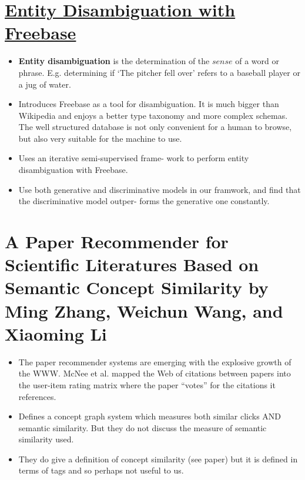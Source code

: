 \documentclass[12pt]{article}
\newcommand{\bt}[1]{\textbf{#1}}
\newcommand{\bi}[0]{  \begin{itemize}}
\newcommand{\ei}[0]{  \end{itemize}}
\newcommand{\q}[0]{\item}
\begin{document}
\section{\href{https://github.com/nmonath/NLPProject/blob/master/research/papers/7-entity_desambiguation_freebase.pdf}{Entity Disambiguation with Freebase}}
\bi
\q \bt{Entity disambiguation} is the determination of the $sense$ of a word or phrase. E.g. determining if `The pitcher fell over' refers to a baseball player or a jug of water.
\q Introduces Freebase as a tool for disambiguation. It is much bigger than Wikipedia and enjoys a better type taxonomy and more complex schemas. The well structured database is not only convenient for a human to browse, but also very suitable for the machine to use.
\q Uses an iterative semi-supervised frame- work to perform entity disambiguation with Freebase.  
\q Use both generative and discriminative models in our framwork, and find that the discriminative model outper- forms the generative one constantly.
\ei

\section{A Paper Recommender for Scientific Literatures Based on Semantic Concept Similarity by Ming Zhang, Weichun Wang, and Xiaoming Li}
\bi
\q The paper recommender systems are emerging with the explosive growth of the WWW. McNee et al. mapped the Web of citations between papers into the user-item rating matrix where the paper ``votes'' for the citations it references. 
\q Defines a concept graph system which measures both similar clicks AND semantic similarity. But they do not discuss the measure of semantic similarity used. 
\q They do give a definition of concept similarity (see paper) but it is defined in terms of tags and so perhaps not useful to us.
\ei
 
  
\end{document}
